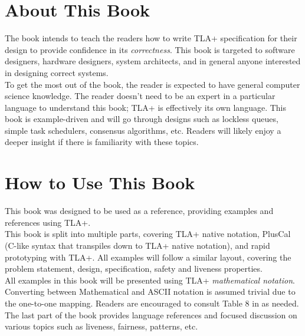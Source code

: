 \section{About This Book}

The book intends to teach the readers how to write TLA+ specification for their
design to provide confidence in its \textit{correctness}. This book is targeted
to software designers, hardware designers, system architects, and in general
anyone interested in designing correct systems.\\

To get the most out of the book, the reader is expected to have general computer
science knowledge. The reader doesn't need to be an expert in a particular
language to understand this book; TLA+ is effectively its own language. This
book is example-driven and will go through designs such as lockless queues,
simple task schedulers, consensus algorithms, etc. Readers will likely enjoy a
deeper insight if there is familiarity with these topics.

\section{How to Use This Book}

This book was designed to be used as a reference, providing examples and
references using TLA+.\\

This book is split into multiple parts, covering TLA+ native notation, PlusCal
(C-like syntax that transpiles down to TLA+ native notation), and rapid
prototyping with TLA+. All examples will follow a similar layout, covering the
problem statement, design, specification, safety and liveness properties.\\

All examples in this book will be presented using TLA+ \textit{mathematical
notation}. Converting between Mathematical and ASCII notation is assumed trivial
due to the one-to-one mapping. Readers are encouraged to consult Table 8 in
\cite{ss} as needed.\\

The last part of the book provides language references and focused discussion on
various topics such as liveness, fairness, patterns, etc.